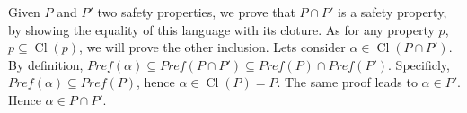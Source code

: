 \documentclass[11pt,a4paper]{article}
\DeclareMathOperator{\Cl}{Cl}
\begin{document}
\begin{Answer}[number=5]
\begin{itemize}
\end{itemize}
\Question%
Given $P$ and $P'$ two safety properties, we prove that $P\cap P'$ is a safety property, by showing the equality of this language with its cloture.
As for any property $p$, $p \subseteq \Cl(p)$, we will prove the other inclusion. Lets consider $\alpha \in \Cl(P\cap P')$. By definition, $Pref(\alpha) \subseteq Pref(P\cap P') \subseteq Pref(P) \cap Pref(P')$\footnotemark[2].
Specificly, $Pref(\alpha) \subseteq Pref(P)$, hence $\alpha \in \Cl(P) = P$. The same proof leads to $\alpha \in P'$. Hence $\alpha \in P\cap P'$.


\end{Answer}
\end{document}

